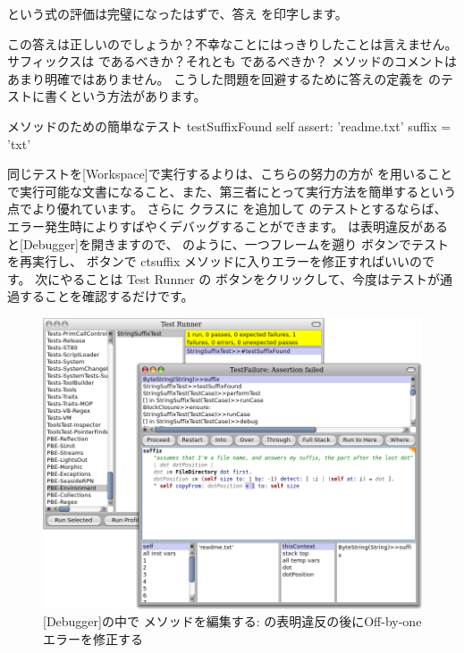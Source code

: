 \documentclass[a4paper,10pt,twoside]{book}
\begin{document}

 という式の評価は完璧になったはずで、答え  を印字します。

この答えは正しいのでしょうか？不幸なことにはっきりしたことは言えません。サフィックスは  であるべきか？それとも  であるべきか？  メソッドのコメントはあまり明確ではありません。
こうした問題を回避するために答えの定義を  のテストに書くという方法があります。

\begin{method}[testSuffix]{ メソッドのための簡単なテスト}
testSuffixFound
	self assert: 'readme.txt' suffix = 'txt'
\end{method}

同じテストを[Workspace]で実行するよりは、こちらの努力の方が \sunit を用いることで実行可能な文書になること、また、第三者にとって実行方法を簡単するという点でより優れています。
さらに  クラスに  を追加して \sunit のテストとするならば、エラー発生時によりすばやくデバッグすることができます。
\sunit は表明違反があると[Debugger]を開きますので、 のように、一つフレームを遡り  ボタンでテストを再実行し、 ボタンで ct{suffix} メソッドに入りエラーを修正すればいいのです。
次にやることは \sunit Test Runner の  ボタンをクリックして、今度はテストが通過することを確認するだけです。

\begin{figure}[btp]
	\begin{center}
		\includegraphics[width=\textwidth]{fixOffByOne}
	\end{center}
	\caption{[Debugger]の中で  メソッドを編集する: \sunit の表明違反の後にOff-by-one エラーを修正する}
\end{figure}
\end{document}
